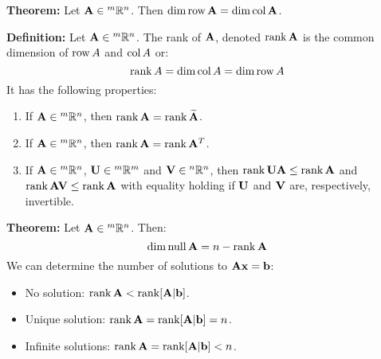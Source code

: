 \documentclass{article}
\begin{document}
\begin{minipage}[t]{.45\textwidth}
        \textbf{Theorem:} Let $\mathbf{A} \in {^m}\mathbb{R}^n$. Then $\dim \mathrm{row}\,\mathbf{A} = \dim \mathrm{col}\,\mathbf{A}$.
        \vspace{-2mm} %
        
        \textbf{Definition:} Let $\mathbf{A} \in {^m}\mathbb{R}^n$. The rank of $\mathbf{A}$, denoted $\rank \mathbf{A}$ is the common dimension of $\mathrm{row}\,A$ and $\mathrm{col}\,A$ or:
        \begin{equation*}
            \rank A = \dim \mathrm{col}\,A = \dim \mathrm{row}\,A
        \end{equation*}
        It has the following properties:
        \vspace{1mm}
        \begin{enumerate}[label=\textbf{Property \Roman*}, leftmargin=18mm]
            \item If $\mathbf{A} \in {^m}\mathbb{R}^n$, then $\rank \mathbf{A} = \rank \widetilde{\mathbf{A}}$.
            \item If $\mathbf{A} \in {^m}\mathbb{R}^n$, then $\rank \mathbf{A} = \rank \mathbf{A}^T$.
            \item If $\mathbf{A} \in {^m}\mathbb{R}^n$, $\mathbf{U} \in {^m}\mathbb{R}^m$ and $\mathbf{V} \in {^n}\mathbb{R}^n$, then $\rank \mathbf{UA} \le \rank \mathbf{A}$ and $\rank \mathbf{AV} \le \rank \mathbf{A}$ with equality holding if $\mathbf{U}$ and $\mathbf{V}$ are, respectively, invertible.
        \end{enumerate}
        \vspace{2mm}

        \textbf{Theorem:} Let $\mathbf{A} \in {^m}\mathbb{R}^n$. Then:
        \begin{equation*}
            \dim \mathrm{null}\,\mathbf{A} = n - \rank \mathbf{A}
        \end{equation*}
        We can determine the number of solutions to $\mathbf{Ax}=\mathbf{b}$:
        \begin{itemize}
            \item No solution: $\rank\mathbf{A} < \rank[\mathbf{A}|\mathbf{b}]$.
            \item Unique solution: $\rank \mathbf{A} = \rank[\mathbf{A}|\mathbf{b}] = n$.
            \item Infinite solutions: $\rank \mathbf{A} = \rank[\mathbf{A}|\mathbf{b}]<n$.
        \end{itemize}
    \end{minipage} %
    \hfill
\end{document}
